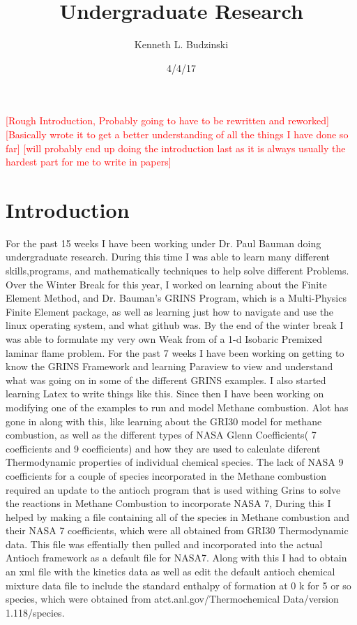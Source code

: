 \documentclass{article}
\title{Undergraduate Research}
\author{Kenneth L. Budzinski}
\date{4/4/17}
\newcommand{\red}[1]{\textcolor{red}{[#1]}} %
\begin{document}
\maketitle
\tableofcontents

\vspace{8mm}
\red{Rough Introduction, Probably going to have to be rewritten and reworked}
\red{Basically wrote it to get a better understanding of all the things I have done so far}
\red{will probably end up doing the introduction last as it is always usually the hardest part for me to write in papers}
\vspace{5mm}
\newpage
\section{Introduction}
For the past 15 weeks I have been working under Dr. Paul Bauman doing undergraduate research. During this time I was able to learn many different skills,programs, and mathematically techniques to help solve different Problems. Over the Winter Break for this year, I worked on learning about the Finite Element Method, and Dr. Bauman's GRINS Program, which is a Multi-Physics Finite Element package, as well as learning just how to navigate and use the linux operating system, and what github was. By the end of the winter break I was able to formulate my very own Weak from of a 1-d Isobaric Premixed laminar flame problem. For the past 7 weeks I have been working on getting to know the GRINS Framework and learning Paraview to view and understand what was going on in some of the different GRINS examples. I also started learning Latex to write things like this. Since then I have been working on modifying one of the examples to run and model Methane combustion. Alot has gone in along with this, like learning about the GRI30 model for methane combustion, as well as the different types of NASA Glenn Coefficients( 7 coefficients and 9 coefficients) and how they are used to calculate diferent Thermodynamic properties of individual chemical species. The lack of NASA 9 coefficients for a couple of species incorporated in the Methane combustion required an update to the antioch program that is used withing Grins to solve the reactions in Methane Combustion to incorporate NASA 7, During this I helped by making a file containing all of the species in Methane combustion and their NASA 7 coefficients, which were all obtained from GRI30 Thermodynamic data. This file was effentially then pulled and incorporated into the actual Antioch framework as a default file for NASA7. Along with this I had to obtain an xml file with the kinetics data as well as edit the default antioch chemical mixture data file to include the standard enthalpy of formation at 0 k for 5 or so species, which were obtained from atct.anl.gov/Thermochemical Data/version 1.118/species.
\end{document}
